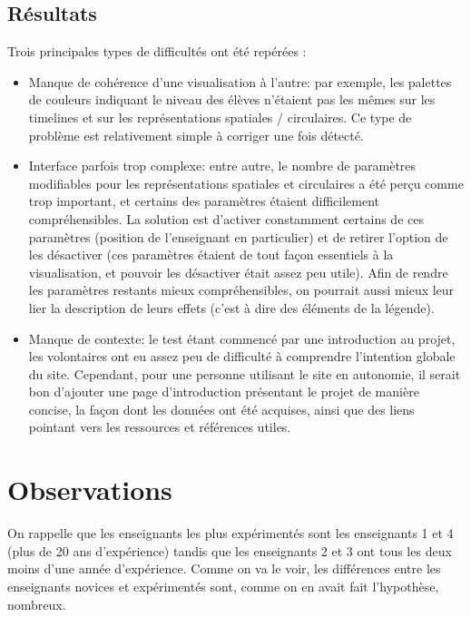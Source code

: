 \documentclass{article}
\begin{document}
\subsection{Résultats}
Trois principales types de difficultés ont été repérées :
\begin{itemize}
    \item Manque de cohérence d'une visualisation à l'autre: par exemple, les palettes de couleurs indiquant le niveau des élèves n'étaient pas les mêmes sur les timelines et sur les représentations spatiales / circulaires. Ce type de problème est relativement simple à corriger une fois détecté.
    \item Interface parfois trop complexe: entre autre, le nombre de paramètres modifiables pour les représentations spatiales et circulaires a été perçu comme trop important, et certains des paramètres étaient difficilement compréhensibles. La solution est d'activer constamment certains de ces paramètres (position de l'enseignant en particulier) et de retirer l'option de les désactiver (ces paramètres étaient de tout façon essentiels à la visualisation, et pouvoir les désactiver était assez peu utile). Afin de rendre les paramètres restants mieux compréhensibles, on pourrait aussi mieux leur lier la description de leurs effets (c'est à dire des éléments de la légende).
    \item Manque de contexte: le test étant commencé par une introduction au projet, les volontaires ont eu assez peu de difficulté à comprendre l'intention globale du site. Cependant, pour une personne utilisant le site en autonomie, il serait bon d'ajouter une page d'introduction présentant le projet de manière concise, la façon dont les données ont été acquises, ainsi que des liens pointant vers les ressources et références utiles.
\end{itemize}

\section{Observations}
On rappelle que les enseignants les plus expérimentés sont les enseignants 1 et 4 (plus de 20 ans d'expérience) tandis que les enseignants 2 et 3 ont tous les deux moins d'une année d'expérience. Comme on va le voir, les différences entre les enseignants novices et expérimentés sont, comme on en avait fait l'hypothèse, nombreux.
\end{document}

